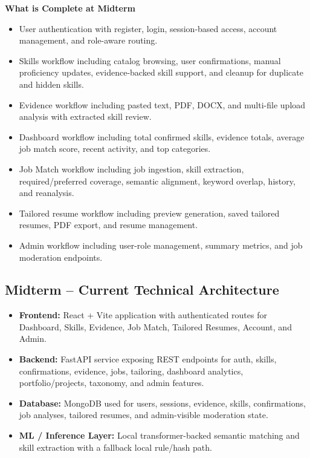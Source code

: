 \documentclass[11pt]{article}
\begin{document}
\vspace{0.75em}
\noindent\textbf{What is Complete at Midterm}
\begin{itemize}
  \item User authentication with register, login, session-based access, account management, and role-aware routing.
  \item Skills workflow including catalog browsing, user confirmations, manual proficiency updates, evidence-backed skill support, and cleanup for duplicate and hidden skills.
  \item Evidence workflow including pasted text, PDF, DOCX, and multi-file upload analysis with extracted skill review.
  \item Dashboard workflow including total confirmed skills, evidence totals, average job match score, recent activity, and top categories.
  \item Job Match workflow including job ingestion, skill extraction, required/preferred coverage, semantic alignment, keyword overlap, history, and reanalysis.
  \item Tailored resume workflow including preview generation, saved tailored resumes, PDF export, and resume management.
  \item Admin workflow including user-role management, summary metrics, and job moderation endpoints.
\end{itemize}

\subsection*{Midterm -- Current Technical Architecture}
\begin{itemize}
  \item \textbf{Frontend:} React + Vite application with authenticated routes for Dashboard, Skills, Evidence, Job Match, Tailored Resumes, Account, and Admin.
  \item \textbf{Backend:} FastAPI service exposing REST endpoints for auth, skills, confirmations, evidence, jobs, tailoring, dashboard analytics, portfolio/projects, taxonomy, and admin features.
  \item \textbf{Database:} MongoDB used for users, sessions, evidence, skills, confirmations, job analyses, tailored resumes, and admin-visible moderation state.
  \item \textbf{ML / Inference Layer:} Local transformer-backed semantic matching and skill extraction with a fallback local rule/hash path.
\end{itemize}
\end{document}
